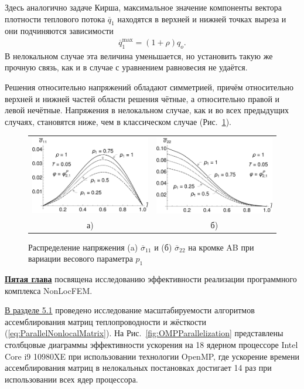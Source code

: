 Здесь аналогично задаче Кирша, максимальное значение компоненты вектора плотности теплового потока $\overline{q}_1$ находятся в верхней и нижней точках выреза и они подчиняются зависимости
\begin{gather*}
	\overline{q}_1^{\max} = (1 + \rho) q_o.
\end{gather*}
В нелокальном случае эта величина уменьшается, но установить такую же прочную связь, как и в случае с уравнением равновесия не удаётся.

Решения относительно напряжений обладают симметрией, причём относительно верхней и нижней частей области решения чётные, а относительно правой и левой нечётные. Напряжения в нелокальном случае, как и во всех предыдущих случаях, становятся ниже, чем в классическом случае (Рис.~\ref{fig:ThermalKirshP1Variation}).

\begin{figure}[ht] \centering
	\begin{tabular}{cc}
		\includegraphics[width=0.4\linewidth]{pics/ThermalKirshSigma11VariationP1.pdf} &
		\includegraphics[width=0.4\linewidth]{pics/ThermalKirshSigma22VariationP1.pdf} \\
		а) & б)
	\end{tabular}
    \caption{Распределение напряжения (a) $\overline{\sigma}_{11}$ и (б) $\overline{\sigma}_{22}$ на кромке AB при вариации весового параметра $p_1$}
    \label{fig:ThermalKirshP1Variation}
\end{figure}

\underline{\textbf{Пятая глава}} посвящена исследованию эффективности реализации программного комплекса NonLocFEM.

\underline{В разделе 5.1} проведено исследование масштабируемости алгоритмов ассемблирования матриц теплопроводности и жёсткости (\ref{eq:ParallelNonlocalMatrix}). На Рис.~\ref{fig:OMPParallelization} представлены столбцовые диаграммы эффективности ускорения на 18 ядерном процессоре Intel Core i9
10980XE при использовании технологии OpenMP, где ускорение времени ассемблирования матриц в нелокальных постановках достигает 14 раз при использовании всех ядер процессора.

